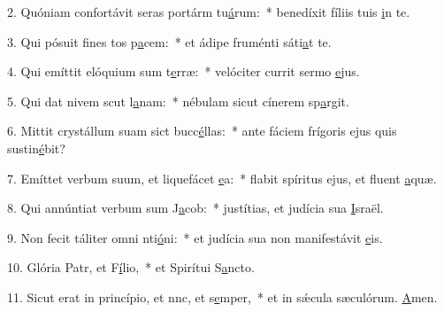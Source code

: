 2. Quóniam confortávit seras portárm tu\uline{á}rum:~* benedíxit fíliis tuis \uline{i}n te.\par 
3. Qui pósuit fines tos p\uline{a}cem:~* et ádipe fruménti sáti\uline{a}t te.\par 
4. Qui emíttit elóquium sum t\uline{e}rræ:~* velóciter currit sermo \uline{e}jus.\par 
5. Qui dat nivem scut l\uline{a}nam:~* nébulam sicut cínerem sp\uline{a}rgit.\par 
6. Mittit crystállum suam sict bucc\uline{é}llas:~* ante fáciem frígoris ejus quis sustin\uline{é}bit?\par 
7. Emíttet verbum suum, et liquefácet \uline{e}a:~* flabit spíritus ejus, et fluent \uline{a}quæ.\par 
8. Qui annúntiat verbum sum J\uline{a}cob:~* justítias, et judícia sua \uline{I}sraël.\par 
9. Non fecit táliter omni nti\uline{ó}ni:~* et judícia sua non manifestávit \uline{e}is.\par 
10. Glória Patr, et F\uline{í}lio,~* et Spirítui S\uline{a}ncto.\par 
11. Sicut erat in princípio, et nnc, et s\uline{e}mper,~* et in sǽcula sæculórum. \uline{A}men.\par 
